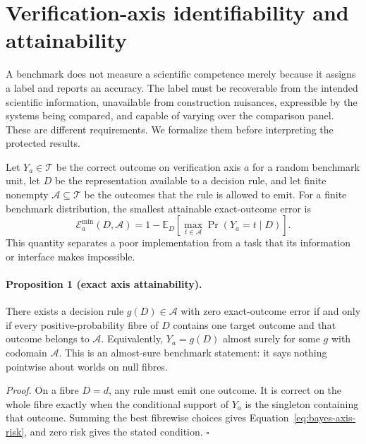 \section{Verification-axis identifiability and attainability}
\label{sec:axis-theory}

A benchmark does not measure a scientific competence merely because it assigns a
label and reports an accuracy.  The label must be recoverable from the intended
scientific information, unavailable from construction nuisances, expressible by
the systems being compared, and capable of varying over the comparison panel.
These are different requirements.  We formalize them before interpreting the
protected results.

Let $Y_a\in\mathcal{T}$ be the correct outcome on verification axis $a$ for a
random benchmark unit, let $D$ be the representation available to a decision
rule, and let finite nonempty $\mathcal{A}\subseteq\mathcal{T}$ be the outcomes
that the rule is allowed to emit.  For a finite benchmark distribution, the
smallest attainable exact-outcome error is
\begin{equation}
  \mathcal{E}_a^{\min}(D,\mathcal{A})
  = 1-\mathbb{E}_{D}\!\left[
      \max_{t\in\mathcal{A}}\Pr(Y_a=t\mid D)
    \right].
  \label{eq:bayes-axis-risk}
\end{equation}
This quantity separates a poor implementation from a task that its information
or interface makes impossible.

\paragraph{Proposition 1 (exact axis attainability).}
There exists a decision rule $g(D)\in\mathcal{A}$ with zero exact-outcome error
if and only if every positive-probability fibre of $D$ contains one target
outcome and that outcome belongs to $\mathcal{A}$.  Equivalently,
$Y_a=g(D)$ almost surely for some $g$ with codomain $\mathcal{A}$.  This is an
almost-sure benchmark statement: it says nothing pointwise about worlds on null
fibres.

\emph{Proof.}  On a fibre $D=d$, any rule must emit one outcome.  It is correct
on the whole fibre exactly when the conditional support of $Y_a$ is the
singleton containing that outcome.  Summing the best fibrewise choices gives
Equation~\ref{eq:bayes-axis-risk}, and zero risk gives the stated condition.
\hfill$\square$

